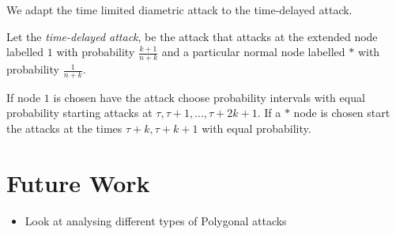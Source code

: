 \documentclass[11pt]{beamer}
\begin{document}
\begin{frame}{\insertsection}
We adapt the time limited diametric attack to the time-delayed attack.

\begin{definition}
Let the \textit{time-delayed attack}, be the attack that attacks at the extended node labelled $1$ with probability $\frac{k+1}{n+k}$ and a particular normal node labelled $*$ with probability $\frac{1}{n+k}$.

If node $1$ is chosen have the attack choose probability intervals with equal probability starting attacks at $\tau, \tau+1,...,\tau+2k+1$. If a $*$ node is chosen start the attacks at the times $\tau+k,\tau+k+1$ with equal probability.
\end{definition}

\begin{figure}
\begin{center}
\end{center}
\end{figure}



\end{frame}

\section[]{Future Work}
\hypertarget{Future work}{}
\begin{frame}{\insertsection}

\begin{itemize}
\item Look at analysing different types of Polygonal attacks
\end{itemize}

\end{frame}
\end{document}
